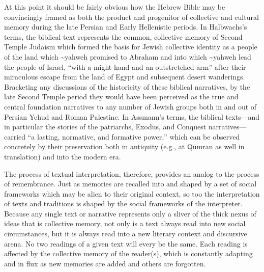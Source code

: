 At this point it should be fairly obvious how the Hebrew Bible may be
convincingly framed as both the product and progenitor of collective and
cultural memory during the late Persian and Early Hellenistic periods.
In Halbwachs's terms, the biblical text represents the common,
collective memory of Second Temple Judaism which formed the basis for
Jewish collective identity as a people of the land which
\textasciitilde{}yahweh promised to Abraham and into which
\textasciitilde{}yahweh lead the people of Israel, ``with a might hand
and an outstretched arm'' after their miraculous escape from the land of
Egypt and subsequent desert wanderings. Bracketing any discussions of
the historicity of these biblical narratives, by the late Second Temple
period they would have been perceived as the true and central foundation
narratives to any number of Jewish groups both in and out of Persian
Yehud and Roman Palestine. In Assmann's terms, the biblical texts---and
in particular the stories of the patriarchs, Exodus, and Conquest
narratives---carried ``a lasting, normative, and formative
power,''\autocite[38]{assmann2011} which can be observed concretely by
their preservation both in antiquity (e.g., at Qumran as well in
translation) and into the modern era.

The process of textual interpretation, therefore, provides an analog to
the process of remembrance. Just as memories are recalled into and
shaped by a set of social frameworks which may be alien to their
original context, so too the interpretation of texts and traditions is
shaped by the social frameworks of the interpreter. Because any single
text or narrative represents only a sliver of the thick nexus of ideas
that is collective memory, not only is a text always read into new
social circumstances, but it is always read into a new literary context
and discursive arena. No two readings of a given text will every be the
same. Each reading is affected by the collective memory of the
reader(s), which is constantly adapting and in flux as new memories are
added and others are forgotten.

